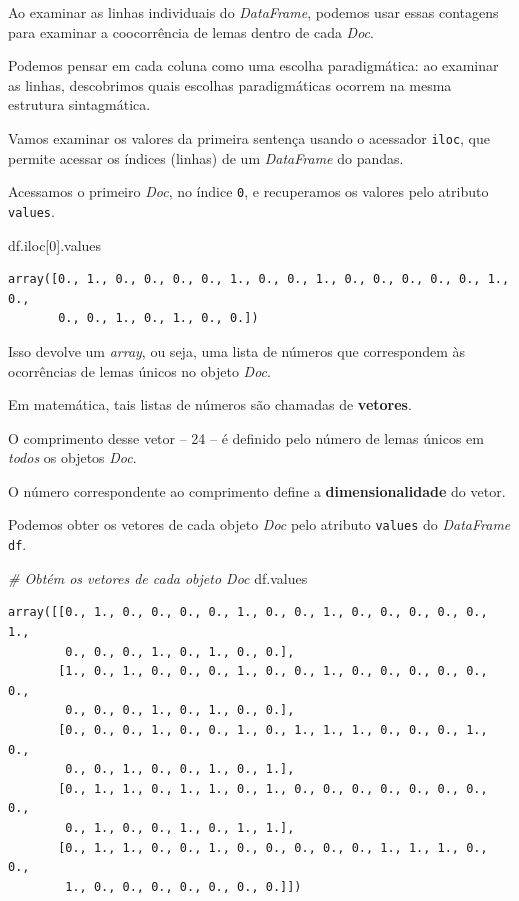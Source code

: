 \documentclass[
  brazilian,
]{article}
\newenvironment{Shaded}{}{}
\newcommand{\CommentTok}[1]{\textcolor[rgb]{0.38,0.63,0.69}{\textit{#1}}}
\newcommand{\DecValTok}[1]{\textcolor[rgb]{0.25,0.63,0.44}{#1}}
\newcommand{\NormalTok}[1]{#1}
\begin{document}
Ao examinar as linhas individuais do \emph{DataFrame}, podemos usar
essas contagens para examinar a coocorrência de lemas dentro de cada
\emph{Doc}.

Podemos pensar em cada coluna como uma escolha paradigmática: ao
examinar as linhas, descobrimos quais escolhas paradigmáticas ocorrem na
mesma estrutura sintagmática.

Vamos examinar os valores da primeira sentença usando o acessador
\texttt{iloc}, que permite acessar os índices (linhas) de um
\emph{DataFrame} do pandas.

Acessamos o primeiro \emph{Doc}, no índice \texttt{0}, e recuperamos os
valores pelo atributo \texttt{values}.

\begin{Shaded}
\begin{Highlighting}[]
\NormalTok{df.iloc[}\DecValTok{0}\NormalTok{].values}
\end{Highlighting}
\end{Shaded}

\begin{verbatim}
array([0., 1., 0., 0., 0., 0., 1., 0., 0., 1., 0., 0., 0., 0., 0., 1., 0.,
       0., 0., 1., 0., 1., 0., 0.])
\end{verbatim}

Isso devolve um \emph{array}, ou seja, uma lista de números que
correspondem às ocorrências de lemas únicos no objeto \emph{Doc}.

Em matemática, tais listas de números são chamadas de \textbf{vetores}.

O comprimento desse vetor -- 24 -- é definido pelo número de lemas
únicos em \emph{todos} os objetos \emph{Doc}.

O número correspondente ao comprimento define a
\textbf{dimensionalidade} do vetor.

Podemos obter os vetores de cada objeto \emph{Doc} pelo atributo
\texttt{values} do \emph{DataFrame} \texttt{df}.

\begin{Shaded}
\begin{Highlighting}[]
\CommentTok{\# Obtém os vetores de cada objeto Doc}
\NormalTok{df.values}
\end{Highlighting}
\end{Shaded}

\begin{verbatim}
array([[0., 1., 0., 0., 0., 0., 1., 0., 0., 1., 0., 0., 0., 0., 0., 1.,
        0., 0., 0., 1., 0., 1., 0., 0.],
       [1., 0., 1., 0., 0., 0., 1., 0., 0., 1., 0., 0., 0., 0., 0., 0.,
        0., 0., 0., 1., 0., 1., 0., 0.],
       [0., 0., 0., 1., 0., 0., 1., 0., 1., 1., 1., 0., 0., 0., 1., 0.,
        0., 0., 1., 0., 0., 1., 0., 1.],
       [0., 1., 1., 0., 1., 1., 0., 1., 0., 0., 0., 0., 0., 0., 0., 0.,
        0., 1., 0., 0., 1., 0., 1., 1.],
       [0., 1., 1., 0., 0., 1., 0., 0., 0., 0., 0., 1., 1., 1., 0., 0.,
        1., 0., 0., 0., 0., 0., 0., 0.]])
\end{verbatim}
\end{document}
